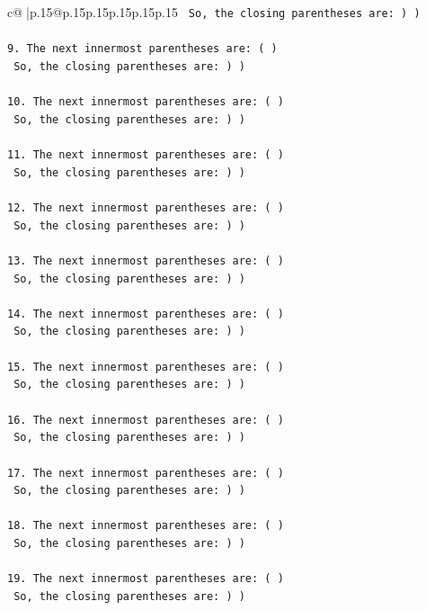 \documentclass{article}
\begin{document}
{\begin{supertabular}{c@{$\;$}|p{.15\linewidth}@{}p{.15\linewidth}p{.15\linewidth}p{.15\linewidth}p{.15\linewidth}p{.15\linewidth}}
{{{\texttt{   So, the closing parentheses are: ) )} \\
\\ 
\texttt{9. The next innermost parentheses are: ( ) } \\
\texttt{   So, the closing parentheses are: ) )} \\
\\ 
\texttt{10. The next innermost parentheses are: ( ) } \\
\texttt{    So, the closing parentheses are: ) )} \\
\\ 
\texttt{11. The next innermost parentheses are: ( ) } \\
\texttt{    So, the closing parentheses are: ) )} \\
\\ 
\texttt{12. The next innermost parentheses are: ( ) } \\
\texttt{    So, the closing parentheses are: ) )} \\
\\ 
\texttt{13. The next innermost parentheses are: ( ) } \\
\texttt{    So, the closing parentheses are: ) )} \\
\\ 
\texttt{14. The next innermost parentheses are: ( ) } \\
\texttt{    So, the closing parentheses are: ) )} \\
\\ 
\texttt{15. The next innermost parentheses are: ( ) } \\
\texttt{    So, the closing parentheses are: ) )} \\
\\ 
\texttt{16. The next innermost parentheses are: ( ) } \\
\texttt{    So, the closing parentheses are: ) )} \\
\\ 
\texttt{17. The next innermost parentheses are: ( ) } \\
\texttt{    So, the closing parentheses are: ) )} \\
\\ 
\texttt{18. The next innermost parentheses are: ( ) } \\
\texttt{    So, the closing parentheses are: ) )} \\
\\ 
\texttt{19. The next innermost parentheses are: ( ) } \\
\texttt{    So, the closing parentheses are: ) )} \\
}}}
\end{supertabular}}
\end{document}

